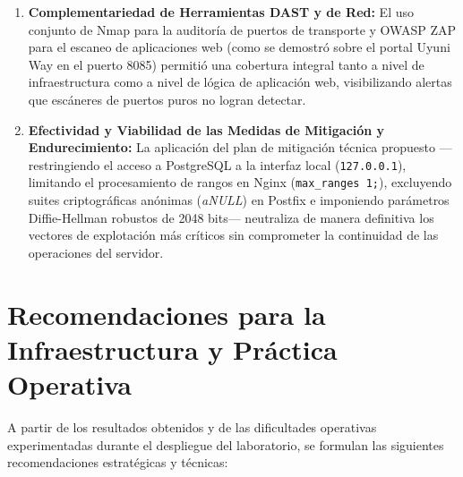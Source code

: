 \begin{enumerate}
  \item \textbf{Complementariedad de Herramientas DAST y de Red:} El uso conjunto de Nmap para la auditoría de puertos de transporte y OWASP ZAP para el escaneo de aplicaciones web (como se demostró sobre el portal Uyuni Way en el puerto 8085) permitió una cobertura integral tanto a nivel de infraestructura como a nivel de lógica de aplicación web, visibilizando alertas que escáneres de puertos puros no logran detectar.

  \item \textbf{Efectividad y Viabilidad de las Medidas de Mitigación y Endurecimiento:} La aplicación del plan de mitigación técnica propuesto —restringiendo el acceso a PostgreSQL a la interfaz local (\texttt{127.0.0.1}), limitando el procesamiento de rangos en Nginx (\texttt{max\_ranges 1;}), excluyendo suites criptográficas anónimas (\textit{aNULL}) en Postfix e imponiendo parámetros Diffie-Hellman robustos de 2048 bits— neutraliza de manera definitiva los vectores de explotación más críticos sin comprometer la continuidad de las operaciones del servidor.
\end{enumerate}

\section{Recomendaciones para la Infraestructura y Práctica Operativa}

A partir de los resultados obtenidos y de las dificultades operativas experimentadas durante el despliegue del laboratorio, se formulan las siguientes recomendaciones estratégicas y técnicas:


